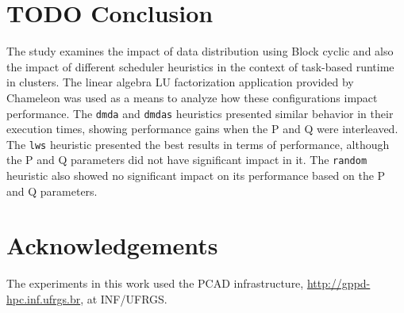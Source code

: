 \documentclass[conference, 10pt, final]{IEEEtran}
\begin{document}
\section{{\bfseries\sffamily TODO} Conclusion}
\label{sec:conclusion}
The study examines the impact of data distribution using Block cyclic and also the impact of different scheduler heuristics in the context of task-based runtime in clusters. The linear algebra LU factorization application provided by Chameleon was used as a means to analyze how these configurations impact performance. The \verb|dmda| and \verb|dmdas| heuristics presented similar behavior in their execution times, showing performance gains when the P and Q were interleaved. The \verb|lws| heuristic presented the best results in terms of performance, although the P and Q parameters did not have significant impact in it. The \verb|random| heuristic also showed no significant impact on its performance based on the P and Q parameters.
\section*{Acknowledgements}

The experiments in this work used the PCAD infrastructure, \url{http://gppd-hpc.inf.ufrgs.br}, at INF/UFRGS.
\clearpage



\end{document}
